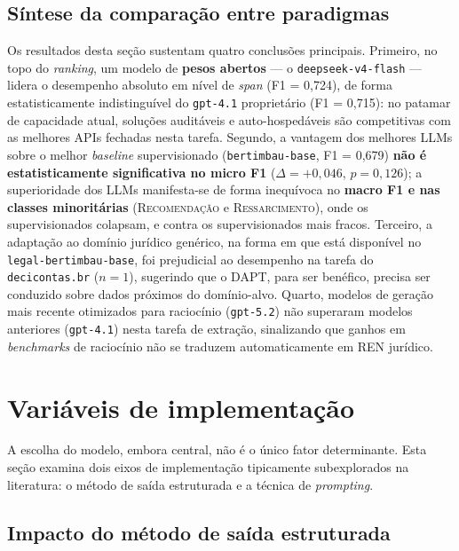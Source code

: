 \subsection{Síntese da comparação entre paradigmas}
\label{subsec:sintese_llm_vs_sup}

Os resultados desta seção sustentam quatro conclusões principais. Primeiro, no topo do \textit{ranking}, um modelo de \textbf{pesos abertos} --- o \texttt{deepseek-v4-flash} --- lidera o desempenho absoluto em nível de \textit{span} (F1 = 0,724), de forma estatisticamente indistinguível do \texttt{gpt-4.1} proprietário (F1 = 0,715): no patamar de capacidade atual, soluções auditáveis e auto-hospedáveis são competitivas com as melhores APIs fechadas nesta tarefa. Segundo, a vantagem dos melhores LLMs sobre o melhor \textit{baseline} supervisionado (\texttt{bertimbau-base}, F1 = 0,679) \textbf{não é estatisticamente significativa no micro F1} ($\Delta = +0{,}046$, $p = 0{,}126$); a superioridade dos LLMs manifesta-se de forma inequívoca no \textbf{macro F1 e nas classes minoritárias} (\textsc{Recomendação} e \textsc{Ressarcimento}), onde os supervisionados colapsam, e contra os supervisionados mais fracos. Terceiro, a adaptação ao domínio jurídico genérico, na forma em que está disponível no \texttt{legal-bertimbau-base}, foi prejudicial ao desempenho na tarefa do \texttt{decicontas.br} ($n = 1$), sugerindo que o DAPT, para ser benéfico, precisa ser conduzido sobre dados próximos do domínio-alvo. Quarto, modelos de geração mais recente otimizados para raciocínio (\texttt{gpt-5.2}) não superaram modelos anteriores (\texttt{gpt-4.1}) nesta tarefa de extração, sinalizando que ganhos em \textit{benchmarks} de raciocínio não se traduzem automaticamente em REN jurídico.

\section{Variáveis de implementação}
\label{sec:variaveis_implementacao}

A escolha do modelo, embora central, não é o único fator determinante. Esta seção examina dois eixos de implementação tipicamente subexplorados na literatura: o método de saída estruturada e a técnica de \textit{prompting}.

\subsection{Impacto do método de saída estruturada}
\label{subsec:saida_estruturada}

